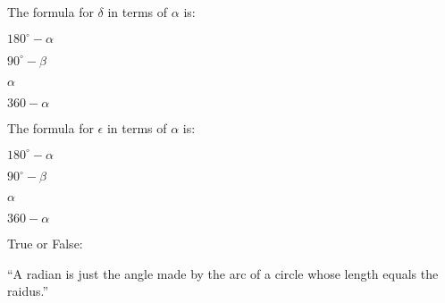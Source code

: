 \documentclass{../ximera}
\begin{document}
\begin{exercise}
 The formula for $\delta$ in terms of $\alpha$ is:
 
\begin{enumerate}
\begin{multicols}{2}
 \item $180^\circ-\alpha$
 \item $90^\circ-\beta$
 \item $\alpha$
 \item $360-\alpha$
\end{multicols}
\end{enumerate}
\end{exercise}

\begin{exercise}
 The formula for $\epsilon$ in terms of $\alpha$ is:
 
\begin{enumerate}
\begin{multicols}{2}
 \item $180^\circ-\alpha$
 \item $90^\circ-\beta$
 \item $\alpha$
 \item $360-\alpha$
\end{multicols}
\end{enumerate}
\end{exercise}

\begin{exercise}
  True or False:

  ``A radian is just the angle made by the arc of a circle whose
  length equals the raidus.''
\end{exercise}

\end{document}
